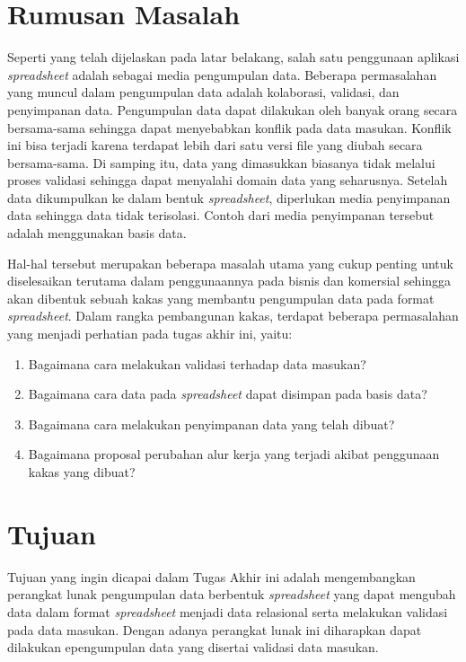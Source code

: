 \section{Rumusan Masalah}\label{RumusanMasalah}

Seperti yang telah dijelaskan pada latar belakang, salah satu penggunaan aplikasi \textit{spreadsheet} adalah sebagai media pengumpulan data. Beberapa permasalahan yang muncul dalam pengumpulan data adalah kolaborasi, validasi, dan penyimpanan data. Pengumpulan data dapat dilakukan oleh banyak orang secara bersama-sama sehingga dapat menyebabkan konflik pada data masukan. Konflik ini bisa terjadi karena terdapat lebih dari satu versi file yang diubah secara bersama-sama. Di samping itu, data yang dimasukkan biasanya tidak melalui proses validasi sehingga dapat menyalahi domain data yang seharusnya. Setelah data dikumpulkan ke dalam bentuk \textit{spreadsheet}, diperlukan media penyimpanan data sehingga data tidak terisolasi. Contoh dari media penyimpanan tersebut adalah menggunakan basis data. 

Hal-hal tersebut merupakan beberapa masalah utama yang cukup penting untuk diselesaikan terutama dalam penggunaannya pada bisnis dan komersial sehingga akan dibentuk sebuah kakas yang membantu pengumpulan data pada format \textit{spreadsheet}. Dalam rangka pembangunan kakas, terdapat beberapa permasalahan yang menjadi perhatian pada tugas akhir ini, yaitu:

\begin{enumerate}
    \item Bagaimana cara melakukan validasi terhadap data masukan?
    \item Bagaimana cara data pada \textit{spreadsheet} dapat disimpan pada basis data?
    \item Bagaimana cara melakukan penyimpanan data yang telah dibuat?
    \item Bagaimana proposal perubahan alur kerja yang terjadi akibat penggunaan kakas yang dibuat?
\end{enumerate}

\section{Tujuan}

Tujuan yang ingin dicapai dalam Tugas Akhir ini adalah mengembangkan perangkat lunak pengumpulan data berbentuk \textit{spreadsheet} yang dapat mengubah data dalam format \textit{spreadsheet} menjadi data relasional serta melakukan validasi pada data masukan. Dengan adanya perangkat lunak ini diharapkan dapat dilakukan epengumpulan data yang disertai validasi data masukan.

